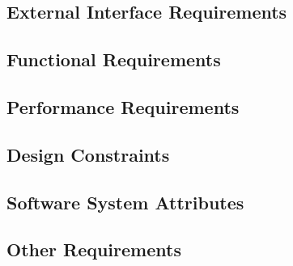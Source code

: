 \documentclass{article}
\begin{document}
	\subsection{External Interface Requirements}
	
	
	\subsection{Functional Requirements}
	
	
	\subsection{Performance Requirements}
	
	
	\subsection{Design Constraints}
	
	
	\subsection{Software System Attributes}
	
	
	\subsection{Other Requirements}
	
\end{document}
